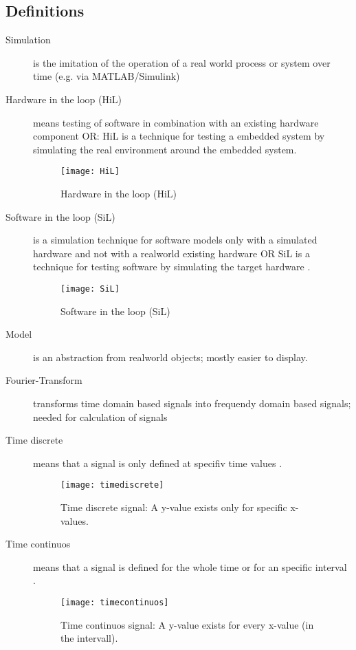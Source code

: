 \subsection{Definitions}

\begin{description}
	\item[Simulation] is the imitation of the operation of a real world process or system over time (e.g. via MATLAB/Simulink)
	\item[Hardware in the loop (HiL)] means testing of software in combination with an existing hardware component OR: HiL is a technique for testing a embedded system by simulating the real environment around the embedded system. 
		\begin{figure}[!h]
		\centering
			\texttt{[image: HiL]}
			\caption{Hardware in the loop (HiL)}
			\label{fig:HiL}
		\end{figure}
	\item[Software in the loop (SiL)] is a simulation technique for software models only with a simulated hardware and not with a realworld existing hardware OR SiL is a technique for testing software by simulating the target hardware .
		\begin{figure}[!h]
			\centering
			\texttt{[image: SiL]}
			\caption{Software in the loop (SiL)}
			\label{fig:SiL}
		\end{figure}
	\item[Model] is an abstraction from realworld objects; mostly easier to display.
	\item[Fourier-Transform] transforms time domain based signals into frequendy domain based signals; needed for calculation of signals
	\item[Time discrete] means that a signal is only defined at specifiv time values .
		\begin{figure}[!h]
			\centering
			\texttt{[image: timediscrete]}
			\caption[Time discrete signal]{Time discrete signal: A y-value exists only for specific x-values.}
			\label{fig:timediscrete}
		\end{figure}
	\item[Time continuos] means that a signal is defined for the whole time or for an specific interval .
		\begin{figure}[!h]
			\centering
			\texttt{[image: timecontinuos]}
			\caption[Time continuos signal]{Time continuos signal: A y-value exists for every x-value (in the intervall).}

\end{figure}
\end{description}
